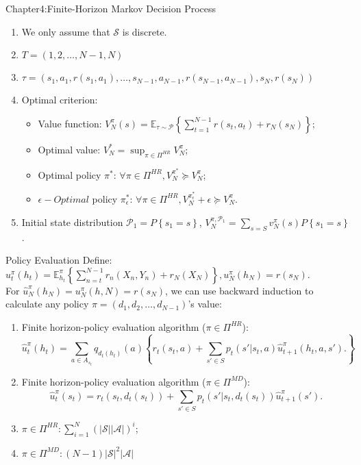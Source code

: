 \documentclass{beamer}
\begin{document}
\begin{frame}[t]{Chapter4:Finite-Horizon Markov Decision Process}
    \begin{enumerate}
        \item We only assume that $ \mathcal{S} $ is discrete.
        \item $ T = \left( 1, 2, \ldots, N-1, N \right) $
        \item $ \tau = (s_1, a_1, r(s_1, a_1),\ldots, s_{N-1}, a_{N-1}, r(s_{N-1},a_{N-1}), s_N, r(s_N) ) $
        \item Optimal criterion:
            \begin{itemize}
                \item Value function: $ V^\pi_N(s) = \mathbb{E}_{\tau \sim \mathcal{P}} \left\{ \sum^{N-1}_{t=1} r(s_t, a_t) + r_N(s_N) \right\}$;
                \item Optimal value: $ V^*_N = \sup_{\pi \in \Pi^{HR}} V^\pi_N $;
                \item Optimal policy $ \pi^* $: $ \forall \pi \in \Pi^{HR}, V^{\pi^*}_N \succeq V^\pi_N $;
                \item $ \epsilon-Optimal$ policy $ \pi^*_\epsilon $: $ \forall \pi \in \Pi^{HR}, V^{\pi^*_\epsilon}_N + \epsilon \succeq V^\pi_N $.
            \end{itemize}
        \item Initial state distribution $ \mathcal{P}_1 = P \left\{ s_1 = s \right\} $, $ V^{\pi, \mathcal{P}_1}_N = \sum^{}_{s=S} v^\pi_N(s) P\left\{ s_1 = s \right\} $.
    \end{enumerate}
\end{frame}

\begin{frame}[t]{Policy Evaluation}
    Define: $ u^\pi_t(h_t) = \mathbb{E}^\pi_{h_t} \left\{ \sum^{N-1}_{n=t} r_n(X_n, Y_n) + r_N(X_N) \right\}, u^\pi_N(h_N) = r(s_N) $.\\
    For $ \hat{u}^\pi_N (h_N) = u^\pi_N (h, N) = r(s_N) $, we can use backward induction to calculate any policy $ \pi = (d_1, d_2, \ldots, d_{N-1}) $'s value:
    \begin{enumerate}
        \item Finite horizon-policy evaluation algorithm ($ \pi \in \Pi^{HR} $):
        \[
            \hat u^\pi_t(h_t) = \sum^{}_{a \in A_{s_t}} q_{d_t(h_t)} (a) \left\{ r_t(s_t, a) + \sum^{}_{s' \in S} p_t(s' | s_t, a) \hat u^\pi_{t+1} (h_t, a, s'). \right\}
        \]
        \item Finite horizon-policy evaluation algorithm ($ \pi \in \Pi^{MD} $):
        \[
            \hat u^\pi_t(s_t) = r_t(s_t, d_t(s_t)) + \sum^{}_{s' \in S} p_t(s' | s_t, d_t(s_t)) \hat u^\pi_{t+1} (s').
        \]
    \item $ \pi \in \Pi^{HR}: \sum^{N}_{i=1} {(|\mathcal{S}| |\mathcal{A}|)}^i $;
    \item $ \pi \in \Pi^{MD}: (N-1) |\mathcal{S}|^2 |\mathcal{A}| $
    \end{enumerate}
\end{frame}
\end{document}
